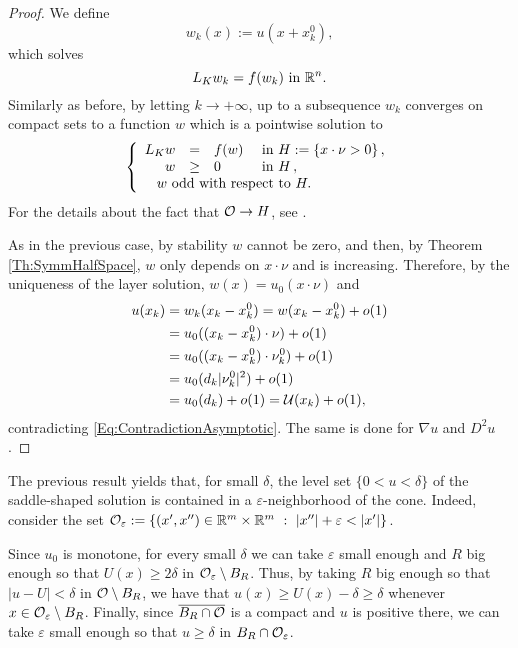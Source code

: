 \begin{proof}
We define
$$ w_k (x) := u(x+x_k^0), $$
which solves
$$ L_K  w_k = f(w_k) \ \text{in } \mathbb{R}^n. $$
Similarly as before, by letting $k\to +\infty$, up to a subsequence $w_k$ converges on compact sets to a function $w$ which is a pointwise solution to
$$
\beqc{\PDEsystem}
L_K  w &=& f(w)  &\textrm{ in } H:=\{x\cdot \nu >0\}\,,\\
w &\geq& 0  &\textrm{ in } H\,,\\
\,\,w \text{ odd with respect to } H. \span\span\span \,
\eeqc
$$
For the details about the fact that $\mathcal{O} \rightarrow H$, see \cite{CabreTerraI}.

As in the previous case, by stability $w$ cannot be zero, and then, by Theorem \ref{Th:SymmHalfSpace}, $w$ only depends on $x\cdot \nu$ and is increasing. Therefore, by the uniqueness of the layer solution, $w(x) = u_0(x\cdot \nu)$ and
\begin{align*}
u(x_k) &= w_k(x_k-x_k^0) = w(x_k-x_k^0) + o(1) \\
&= u_0((x_k-x_k^0)\cdot \nu) + o(1) \\
&= u_0((x_k-x_k^0)\cdot \nu_k^0) + o(1) \\
&= u_0(d_k |\nu_k^0|^2) + o(1) \\
&= u_0(d_k) + o(1) = \mathcal{U} (x_k) + o(1),
\end{align*}
contradicting \eqref{Eq:ContradictionAsymptotic}. The same is done for $\nabla u$ and $D^2 u$.
\end{proof}

\begin{remark}
	\label{Remark:u>delta}
	The previous result yields that, for small $\delta$, the level set $\{0<u<\delta\}$ of the saddle-shaped solution is contained in a $\varepsilon$-neighborhood of the cone. Indeed, consider the set $\ocal_\varepsilon := \{(x',x'')\in \R^m\times\R^m \ : \ |x''|+\varepsilon <|x'| \}$. 
	
	Since $u_0$ is monotone, for every small $\delta$ we can take $\varepsilon$ small enough and $R$ big enough so that $U(x)\geq 2\delta$ in $\mathcal{O}_\varepsilon \setminus B_R$. Thus, by taking $R$ big enough so that $|u-U|< \delta$ in $\mathcal{O} \setminus B_R$, we have that $u(x) \geq U(x)-\delta \geq \delta$ whenever $x\in \mathcal{O}_\varepsilon \setminus B_R$. Finally, since $\overline{B_R \cap \mathcal{O}}$ is a compact and $u$ is positive there, we can take $\varepsilon$ small enough so that $u\geq \delta$ in $B_R\cap \mathcal{O}_\varepsilon$.
\end{remark}